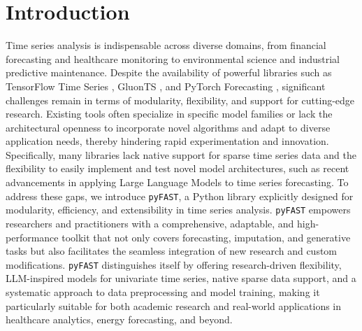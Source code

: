 \documentclass{article}
\begin{document}
\section{Introduction}
Time series analysis is indispensable across diverse domains, from financial forecasting and healthcare monitoring to environmental science and industrial predictive maintenance.  Despite the availability of powerful libraries such as TensorFlow Time Series \cite{tensorflow_ts}, GluonTS \cite{gluonts}, and PyTorch Forecasting \cite{pytorch_forecasting}, significant challenges remain in terms of modularity, flexibility, and support for cutting-edge research. Existing tools often specialize in specific model families or lack the architectural openness to incorporate novel algorithms and adapt to diverse application needs, thereby hindering rapid experimentation and innovation.  Specifically, many libraries lack native support for sparse time series data and the flexibility to easily implement and test novel model architectures, such as recent advancements in applying Large Language Models to time series forecasting. To address these gaps, we introduce \texttt{pyFAST}, a Python library explicitly designed for modularity, efficiency, and extensibility in time series analysis. \texttt{pyFAST} empowers researchers and practitioners with a comprehensive, adaptable, and high-performance toolkit that not only covers forecasting, imputation, and generative tasks but also facilitates the seamless integration of new research and custom modifications.  \texttt{pyFAST} distinguishes itself by offering research-driven flexibility, LLM-inspired models for univariate time series, native sparse data support, and a systematic approach to data preprocessing and model training, making it particularly suitable for both academic research and real-world applications in healthcare analytics, energy forecasting, and beyond.
\end{document}
